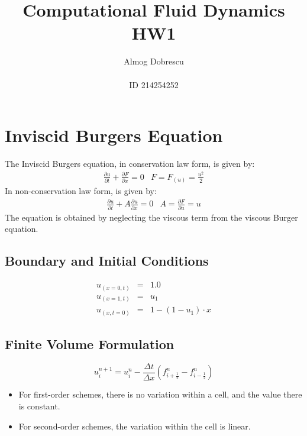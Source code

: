 \documentclass[11pt, a4paper]{article}
\title{Computational Fluid Dynamics \\ HW1}
\author{Almog Dobrescu\\\\ID 214254252}
\begin{document}
\maketitle
\thispagestyle{empty}
\newpage

\setcounter{page}{1}
\tableofcontents
\vfil
\listoffigures
\newpage

\section{Inviscid Burgers Equation}
The Inviscid Burgers equation, in conservation law form, is given by:
\begin{equation}
    \begin{array}{cc}
        \displaystyle\frac{\partial u}{\partial t} + \frac{\partial F}{\partial x} = 0 & F = \displaystyle F_{(u)} = \frac{u^2}{2}
    \end{array}
\end{equation} 
In non-conservation law form, is given by:
\begin{equation}
    \begin{array}{cc}
        \displaystyle\frac{\partial u}{\partial t} + A\frac{\partial u}{\partial x} = 0 & A = \displaystyle \frac{\partial F}{\partial u} = u
    \end{array}
\end{equation}
The equation is obtained by neglecting the viscous term from the viscous Burger equation.

\subsection{Boundary and Initial Conditions}
\begin{equation}
    \begin{array}{lcl}
        u_{(x=0,t)} & = & 1.0 \\
        u_{(x=1,t)} & = & u_1 \\
        u_{(x,t=0)} & = & 1-(1-u_1)\cdot x
    \end{array}
\end{equation}

\subsection{Finite Volume Formulation}
\begin{equation}
    u_i^{n+1}=u_i^n-\frac{\Delta t}{\Delta x}\left(f_{i+\frac{1}{2}}^n-f_{i-\frac{1}{2}}^n\right)
\end{equation}
\begin{itemize}
    \item For first-order schemes, there is no variation within a cell, and the value there is constant.
    \item For second-order schemes, the variation within the cell is linear.  \end{itemize}
\end{document}
